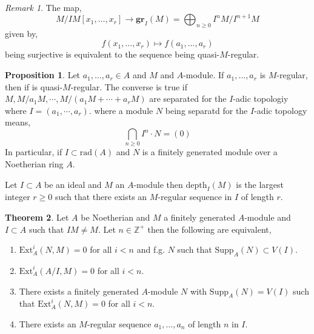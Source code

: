 \documentclass[12pt]{article}
\newcommand{\Z}{\mathbb{Z}}
\newcommand{\Ext}[4]{\mathrm{Ext}^{#1}_{#2} \left( #3, #4 \right)}
\newcommand{\Supp}[2]{\mathrm{Supp}_{#1}\left( #2 \right)}
\newcommand{\rad}[1]{\mathrm{rad}\left( #1 \right)}
\newcommand{\gr}[2]{\mathbf{gr}_{#1}\left(#2\right)}
\newcommand{\depth}[2]{\mathrm{depth}_{#1}\left(#2\right)}
\theoremstyle{remark}
\newtheorem*{remark}{Remark}
\theoremstyle{definition}
\newtheorem{theorem}{Theorem}[section]
\newtheorem{proposition}[theorem]{Proposition}
\newenvironment{definition}[1][Definition:]{\begin{trivlist}
\item[\hskip \labelsep {\bfseries #1}]}{\end{trivlist}}
\begin{document}
\begin{remark}
The map,
\[ M / IM [x_1, \dots, x_r] \to \gr{I}{M} = \bigoplus_{n \ge 0} I^n M / I^{n+1} M \]
given by,
\[ f(x_1, \dots, x_r) \mapsto f(a_1, \dots, a_r) \]
being surjective is equivalent to the sequence being quasi-$M$-regular. 
\end{remark}

\begin{proposition}
Let $a_1, \dots, a_r \in A$ and $M$ and $A$-module. If $a_1, \dots, a_r$ is $M$-regular, then if is quasi-$M$-regular. The converse is true if $M, M/a_1M, \cdots, M / (a_1 M + \cdots + a_r M)$ are separated for the $I$-adic topologiy where $I = (a_1, \cdots, a_r)$. where a module $N$ being separatd for the $I$-adic topology means,
\[ \bigcap_{n \ge 0} I^n \cdot N = (0) \] 
In particular, if $I \subset \rad{A}$ and $N$ is a finitely generated module over a Noetherian ring $A$. 
\end{proposition}

\begin{definition}
Let $I \subset A$ be an ideal and $M$ an $A$-module then $\depth{I}{M}$ is the largest integer $r \ge 0$ such that there exists an $M$-regular sequence in $I$ of length $r$. 
\end{definition}

\begin{theorem}
Let $A$ be Noetherian and $M$ a finitely generated $A$-module and $I \subset A$ such that $IM \neq M$. Let $n \in \Z^+$ then the following are equivalent,
\begin{enumerate}
\item $\Ext{i}{A}{N}{M} = 0$ for all $i < n$ and f.g. $N$ such that $\Supp{A}{N} \subset V(I)$.
\item $\Ext{i}{A}{A/I}{M} = 0$ for all $i < n$.
\item There exists a finitely generated $A$-module $N$ with $\Supp{A}{N} = V(I)$ such that $\Ext{i}{A}{N}{M} = 0$ for all $i < n$.
\item There exists an $M$-regular sequence $a_1, \dots, a_n$ of length $n$ in $I$.
\end{enumerate}
\end{theorem}
\end{document}

